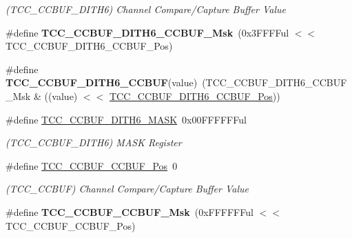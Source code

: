 \begin{DoxyCompactItemize}
\begin{DoxyCompactList}\small\item\em (T\+C\+C\+\_\+\+C\+C\+B\+U\+F\+\_\+\+D\+I\+T\+H6) Channel Compare/\+Capture Buffer Value \end{DoxyCompactList}\item 
\hypertarget{group___s_a_m_l21___t_c_c_ga6a899d30a468f1a32dd80199174797bb}{}\#define {\bfseries T\+C\+C\+\_\+\+C\+C\+B\+U\+F\+\_\+\+D\+I\+T\+H6\+\_\+\+C\+C\+B\+U\+F\+\_\+\+Msk}~(0x3\+F\+F\+F\+Ful $<$$<$ T\+C\+C\+\_\+\+C\+C\+B\+U\+F\+\_\+\+D\+I\+T\+H6\+\_\+\+C\+C\+B\+U\+F\+\_\+\+Pos)\label{group___s_a_m_l21___t_c_c_ga6a899d30a468f1a32dd80199174797bb}

\item 
\hypertarget{group___s_a_m_l21___t_c_c_ga67995f51acc0828634705d5795e6a200}{}\#define {\bfseries T\+C\+C\+\_\+\+C\+C\+B\+U\+F\+\_\+\+D\+I\+T\+H6\+\_\+\+C\+C\+B\+U\+F}(value)~(T\+C\+C\+\_\+\+C\+C\+B\+U\+F\+\_\+\+D\+I\+T\+H6\+\_\+\+C\+C\+B\+U\+F\+\_\+\+Msk \& ((value) $<$$<$ \hyperlink{group___s_a_m_l21___t_c_c_ga8960c366072306d9250f40644a7b77d4}{T\+C\+C\+\_\+\+C\+C\+B\+U\+F\+\_\+\+D\+I\+T\+H6\+\_\+\+C\+C\+B\+U\+F\+\_\+\+Pos}))\label{group___s_a_m_l21___t_c_c_ga67995f51acc0828634705d5795e6a200}

\item 
\hypertarget{group___s_a_m_l21___t_c_c_gab8ff66320380c5dbfd3d6ef64af64550}{}\#define \hyperlink{group___s_a_m_l21___t_c_c_gab8ff66320380c5dbfd3d6ef64af64550}{T\+C\+C\+\_\+\+C\+C\+B\+U\+F\+\_\+\+D\+I\+T\+H6\+\_\+\+M\+A\+S\+K}~0x00\+F\+F\+F\+F\+F\+Ful\label{group___s_a_m_l21___t_c_c_gab8ff66320380c5dbfd3d6ef64af64550}

\begin{DoxyCompactList}\small\item\em (T\+C\+C\+\_\+\+C\+C\+B\+U\+F\+\_\+\+D\+I\+T\+H6) M\+A\+S\+K Register \end{DoxyCompactList}\item 
\hypertarget{group___s_a_m_l21___t_c_c_ga09e2b9e6a9175c4b3cb50fc6302c32c4}{}\#define \hyperlink{group___s_a_m_l21___t_c_c_ga09e2b9e6a9175c4b3cb50fc6302c32c4}{T\+C\+C\+\_\+\+C\+C\+B\+U\+F\+\_\+\+C\+C\+B\+U\+F\+\_\+\+Pos}~0\label{group___s_a_m_l21___t_c_c_ga09e2b9e6a9175c4b3cb50fc6302c32c4}

\begin{DoxyCompactList}\small\item\em (T\+C\+C\+\_\+\+C\+C\+B\+U\+F) Channel Compare/\+Capture Buffer Value \end{DoxyCompactList}\item 
\hypertarget{group___s_a_m_l21___t_c_c_ga25283154ce8229da905c2d9c278e06ad}{}\#define {\bfseries T\+C\+C\+\_\+\+C\+C\+B\+U\+F\+\_\+\+C\+C\+B\+U\+F\+\_\+\+Msk}~(0x\+F\+F\+F\+F\+F\+Ful $<$$<$ T\+C\+C\+\_\+\+C\+C\+B\+U\+F\+\_\+\+C\+C\+B\+U\+F\+\_\+\+Pos)\label{group___s_a_m_l21___t_c_c_ga25283154ce8229da905c2d9c278e06ad}


\end{DoxyCompactItemize}
